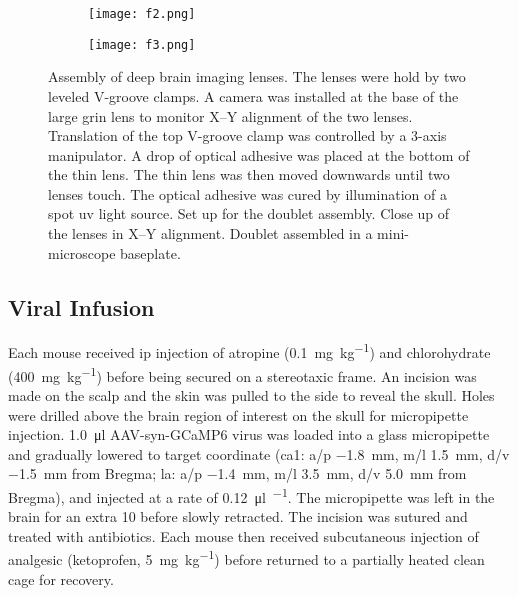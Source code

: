 \begin{figure}[h]
    \begin{subfigure}[t]{\textwidth}
        \centering
        
        \caption{\label{f.lens.1}}
    \end{subfigure}
    \begin{subfigure}[t]{.5\textwidth}
        \centering
        \texttt{[image: f2.png]}
        \caption{\label{f.lens.2}}
    \end{subfigure}
    \begin{subfigure}[t]{.5\textwidth}
        \centering
        \texttt{[image: f3.png]}
        \caption{\label{f.lens.3}}
    \end{subfigure}
    \caption[Assembly of deep brain imaging doublet.]{Assembly of deep brain imaging lenses. The lenses were hold by two leveled V-groove clamps. A camera was installed at the base of the large \gls{grin} lens to monitor X--Y alignment of the two lenses. Translation of the top V-groove clamp was controlled by a 3-axis manipulator. A drop of optical adhesive was placed at the bottom of the thin lens. The thin lens was then moved downwards until two lenses touch. The optical adhesive was cured by illumination of a spot \gls{uv} light source.  Set up for the doublet assembly.  Close up of the lenses in X--Y alignment.  Doublet assembled in a mini-microscope baseplate.}
\end{figure}

\subsection{Viral Infusion \label{viral-infusion}}

Each mouse received \gls{ip} injection of atropine (\SI{0.1}{\mg\per\kg}) and chlorohydrate (\SI{400}{\mg\per\kg}) before being secured on a stereotaxic frame. An incision was made on the scalp and the skin was pulled to the side to reveal the skull. Holes were drilled above the brain region of interest on the skull for micropipette injection. \SI{1.0}{\ul} AAV-syn-GCaMP6 virus was loaded into a glass micropipette and gradually lowered to target coordinate (\gls{ca1}: \gls{a/p} \SI{-1.8}{\mm}, \gls{m/l} \SI{1.5}{\mm}, \gls{d/v} \SI{-1.5}{\mm} from Bregma; \gls{la}: \gls{a/p} \SI{-1.4}{\mm}, \gls{m/l} \SI{3.5}{\mm}, \gls{d/v} \SI{5.0}{\mm} from Bregma), and injected at a rate of \SI{0.12}{\ul\per\min}. The micropipette was left in the brain for an extra \SI{10}{\min} before slowly retracted. The incision was sutured and treated with antibiotics. Each mouse then received subcutaneous injection of analgesic (ketoprofen, \SI{5}{\mg\per\kg}) before returned to a partially heated clean cage for recovery.

